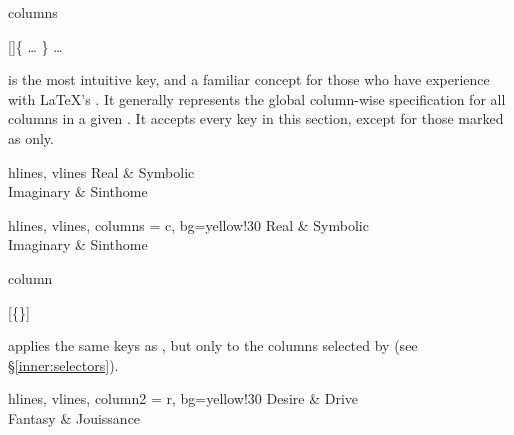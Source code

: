 \begin{codedescribe}[
    key,
    new=2021F,
    update=2021L
  ]{columns}
  \begin{codesyntax}
    []\{
        \quad{}
        \quad\ldots
        \}
        \quad\ldots
        \tsmacro{\end{tblr}}{}
  \end{codesyntax}

   is the most intuitive key, and a familiar concept for those who have experience with \LaTeX's . It generally represents the global column-wise specification for all columns in a given . It accepts every key in this section, except for those marked as  only.

  \begin{codestore}[st=columns:columns]
    \begin{tblr}{hlines, vlines}
      Real      & Symbolic \\
      Imaginary & Sinthome
    \end{tblr}\quad
    \begin{tblr}{
        hlines, vlines,
        columns = {c, bg=yellow!30}
      }
      Real      & Symbolic \\
      Imaginary & Sinthome
    \end{tblr}\end{codestore}
  \begin{center}
  \end{center}
\end{codedescribe}

\begin{codedescribe}[
    key,
    new=2021F
  ]{column}
  \begin{codesyntax}
    [\{\}]
  \end{codesyntax}
   applies the same keys as , but only to the columns selected by  (see \S\ref{inner:selectors}).

  \begin{codestore}[st=columns:column]
    \begin{tblr}{
        hlines, vlines,
        column{2} = {r, bg=yellow!30}
      }
      Desire  & Drive      \\
      Fantasy & Jouissance
    \end{tblr}\end{codestore}
  \begin{center}
  \end{center}
\end{codedescribe}


